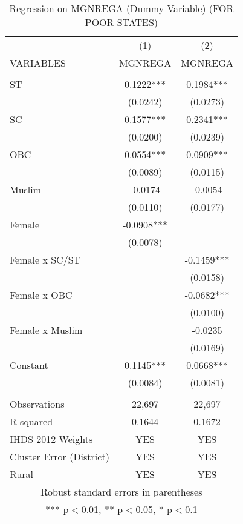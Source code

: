 \documentclass{article}
\begin{document}
\begin{table}[]
\small
    \centering
    \begin{tabular}{lcc} \hline
 & (1) & (2) \\
VARIABLES & MGNREGA & MGNREGA \\ \hline\hline
 &  &  \\
ST & 0.1222*** & 0.1984*** \\
 & (0.0242) & (0.0273) \\
SC & 0.1577*** & 0.2341*** \\
 & (0.0200) & (0.0239) \\
OBC & 0.0554*** & 0.0909*** \\
 & (0.0089) & (0.0115) \\
Muslim & -0.0174 & -0.0054 \\
 & (0.0110) & (0.0177) \\
 Female & -0.0908*** &  \\
 & (0.0078) &  \\
Female x SC/ST &  & -0.1459*** \\
 &  & (0.0158) \\
Female x OBC &  & -0.0682*** \\
 &  & (0.0100) \\
Female x Muslim &  & -0.0235 \\
 &  & (0.0169) \\

Constant & 0.1145*** & 0.0668*** \\
 & (0.0084) & (0.0081) \\
 &  &  \\
Observations & 22,697 & 22,697 \\
 R-squared & 0.1644 & 0.1672 \\
 IHDS 2012 Weights & YES & YES\\
Cluster Error (District) & YES & YES\\
Rural & YES & YES\\\hline
\multicolumn{3}{c}{ Robust standard errors in parentheses} \\
\multicolumn{3}{c}{ *** p$<$0.01, ** p$<$0.05, * p$<$0.1} \\\hline
\end{tabular}
    \caption{Regression on MGNREGA (Dummy Variable) (FOR POOR STATES)}
    \label{tab8}
\end{table}
\end{document}
